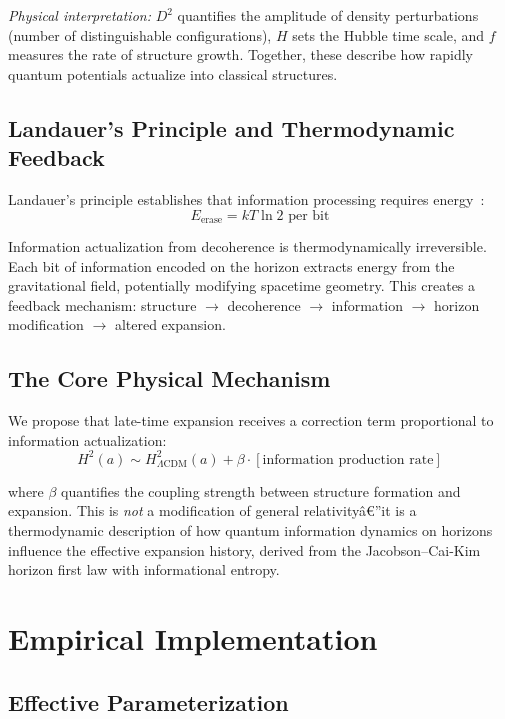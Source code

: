 \documentclass[twocolumn,superscriptaddress,prl,amsmath,amssymb]{revtex4-2}
\begin{document}
\textit{Physical interpretation:} $D^2$ quantifies the amplitude of density perturbations (number of distinguishable configurations), $H$ sets the Hubble time scale, and $f$ measures the rate of structure growth. Together, these describe how rapidly quantum potentials actualize into classical structures.

\subsection{Landauer's Principle and Thermodynamic Feedback}

Landauer's principle establishes that information processing requires energy~\cite{Landauer1961}:
\begin{equation}
E_{\text{erase}} = kT \ln 2 \text{ per bit}
\end{equation}

Information actualization from decoherence is thermodynamically irreversible. Each bit of information encoded on the horizon extracts energy from the gravitational field, potentially modifying spacetime geometry. This creates a feedback mechanism: structure $\to$ decoherence $\to$ information $\to$ horizon modification $\to$ altered expansion.

\subsection{The Core Physical Mechanism}

We propose that late-time expansion receives a correction term proportional to information actualization:
\begin{equation}
H^2(a) \sim H^2_{\Lambda\text{CDM}}(a) + \beta \cdot [\text{information production rate}]
\label{eq:conceptual}
\end{equation}

where $\beta$ quantifies the coupling strength between structure formation and expansion. This is \textit{not} a modification of general relativityâ€”it is a thermodynamic description of how quantum information dynamics on horizons influence the effective expansion history, derived from the Jacobson--Cai-Kim horizon first law with informational entropy.

\section{Empirical Implementation}

\subsection{Effective Parameterization}
\end{document}
